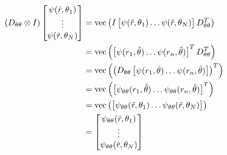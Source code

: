 \begin{align*}
 \left(D_{\theta\theta} \otimes I\right)
 \begin{bmatrix} 
  \psi(\hat{r},\theta_1) \\ 
  \vdots \\ 
  \psi(\hat{r},\theta_N)
 \end{bmatrix}
 &= \operatorname{vec}\left(
     I
     \begin{bmatrix}
      \psi(\hat{r},\theta_1) \hdots \psi(\hat{r},\theta_N)
     \end{bmatrix}
     D_{\theta\theta}^T \right) \\ 
 &= \operatorname{vec}\left(
     \begin{bmatrix}
      \psi(r_1,\hat{\theta})
      \hdots
      \psi(r_n,\hat{\theta})
     \end{bmatrix}^T D_{\theta\theta}^T \right) \\ 
 &= \operatorname{vec}\left(\left(
     D_{\theta\theta}
     \begin{bmatrix}
      \psi(r_1,\hat{\theta})
      \hdots
      \psi(r_n,\hat{\theta})
     \end{bmatrix}
    \right)^T \right) \\ 
 &= \operatorname{vec}\left(
     \begin{bmatrix}
      \psi_{\theta\theta}(r_1,\hat{\theta})
      \hdots
      \psi_{\theta\theta}(r_n,\hat{\theta})
     \end{bmatrix}^T \right) \\ 
 &= \operatorname{vec}\left(
     \begin{bmatrix}
      \psi_{\theta\theta}(\hat{r},\theta_1)
      \hdots
      \psi_{\theta\theta}(\hat{r},\theta_N)
     \end{bmatrix} \right) \\ 
 &= \begin{bmatrix}
     \psi_{\theta\theta}(\hat{r},\theta_1) \\ 
     \vdots \\ 
     \psi_{\theta\theta}(\hat{r},\theta_N)
    \end{bmatrix}
\end{align*}

